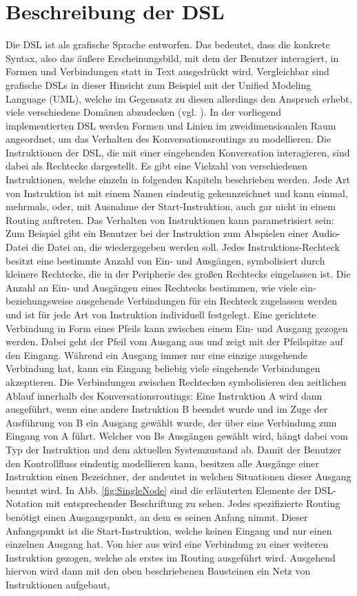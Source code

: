 \section{Beschreibung der DSL}
Die DSL ist als grafische Sprache entworfen. Das bedeutet, dass die konkrete Syntax, also das äußere Erscheinungsbild, mit dem der Benutzer interagiert, in Formen und Verbindungen statt in Text ausgedrückt wird. Vergleichbar sind grafische DSLs in dieser Hinsicht zum Beispiel mit der Unified Modeling Language (UML), welche im Gegensatz zu diesen allerdings den Anspruch erhebt, viele verschiedene Domänen abzudecken (vgl. \cite[S. 17]{Booch:05}).
\newline 
In der vorliegend implementierten DSL werden Formen und Linien im zweidimensionalen Raum angeordnet, um das Verhalten des Konversationsroutings zu modellieren. Die Instruktionen der DSL, die mit einer eingehenden Konversation interagieren, sind dabei als Rechtecke dargestellt. Es gibt eine Vielzahl von verschiedenen Instruktionen, welche einzeln in folgenden Kapiteln beschrieben werden. Jede Art von  Instruktion ist mit einem Namen eindeutig gekennzeichnet und kann einmal, mehrmals, oder, mit Ausnahme der Start-Instruktion, auch gar nicht in einem Routing auftreten. Das Verhalten von Instruktionen kann parametrisiert sein: Zum Beispiel gibt ein Benutzer bei der Instruktion zum Abspielen einer Audio-Datei die Datei an, die wiedergegeben werden soll. Jedes Instruktions-Rechteck besitzt eine bestimmte Anzahl von Ein- und Ausgängen, symbolisiert durch kleinere Rechtecke, die in der Peripherie des großen Rechtecks eingelassen ist. Die Anzahl an Ein- und Ausgängen eines Rechtecks bestimmen, wie viele ein- beziehungsweise ausgehende Verbindungen für ein Rechteck zugelassen werden und ist für jede Art von Instruktion individuell festgelegt. Eine gerichtete Verbindung in Form eines Pfeils kann zwischen einem Ein- und Ausgang gezogen werden. Dabei geht der Pfeil vom Ausgang aus und zeigt mit der Pfeilspitze auf den Eingang. Während ein Ausgang immer nur eine einzige ausgehende Verbindung hat, kann ein Eingang beliebig viele eingehende Verbindungen akzeptieren. Die Verbindungen zwischen Rechtecken symbolisieren den zeitlichen Ablauf innerhalb des Konversationsroutings: Eine Instruktion A wird dann ausgeführt, wenn eine andere Instruktion B beendet wurde und im Zuge der Ausführung von B ein Ausgang gewählt wurde, der über eine Verbindung zum Eingang von A führt. Welcher von Bs Ausgängen gewählt wird, hängt dabei vom Typ der Instruktion und dem aktuellen Systemzustand ab. Damit der Benutzer den Kontrollfluss eindeutig modellieren kann, besitzen alle Ausgänge einer Instruktion einen Bezeichner, der andeutet in welchen Situationen dieser Ausgang benutzt wird.  In Abb. \ref{fig:SingleNode} sind die erläuterten Elemente der DSL-Notation mit entsprechender Beschriftung zu sehen. Jedes spezifizierte Routing benötigt einen Ausgangspunkt, an dem es seinen Anfang nimmt. Dieser Anfangspunkt ist die Start-Instruktion, welche keinen Eingang und nur einen einzelnen Ausgang hat. Von hier aus wird eine Verbindung zu einer weiteren Instruktion gezogen, welche als erstes im Routing ausgeführt wird. Ausgehend hiervon wird dann mit den oben beschriebenen Bausteinen ein Netz von Instruktionen aufgebaut, 